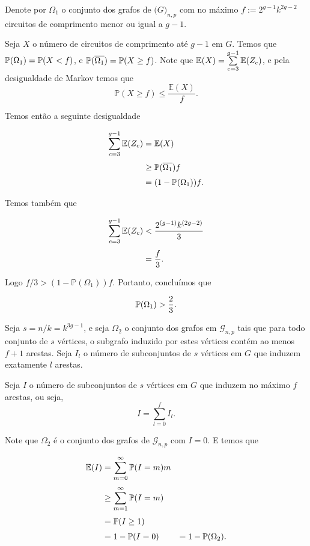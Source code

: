 Denote por $\Omega_1$ o conjunto dos grafos de $\mathbb(G)_{n,p}$ com no máximo $f := 2^{g-1}k^{2g-2}$ circuitos de comprimento menor ou igual a $g-1$.

Seja $X$ o número de circuitos de comprimento até $g-1$ em $G$. Temos que $\mathbb{P}(\Omega_1) = \mathbb{P}(X < f)$, e $\mathbb{P}(\overline{\Omega_1}) = \mathbb{P}(X\geq f)$. Note que $\mathbb{E}(X) = \sum\limits_{c=3}^{g-1}\mathbb{E}(Z_c)$, e pela desigualdade de Markov temos que \[\mathbb{P}(X \geq f) \leq \frac{\mathbb{E}(X)}{f}.\]

Temos então a seguinte desigualdade

\begin{equation*}
\setlength{\jot}{6pt}
\begin{aligned}
\sum\limits_{c=3}^{g-1}\bbe(Z_c) &= \bbe(X) \\ 
&\geq \bbp(\overline{\Omega_1})f \\
&= (1 - \bbp(\Omega_1))f.
\end{aligned}
\end{equation*}

Temos também que

\begin{equation*}
\setlength{\jot}{6pt}
\begin{aligned}
\sum\limits_{c=3}^{g-1}\bbe(Z_c) &< \frac{2^{(g-1)}k^{(2g-2)}}{3} \\
&= \frac{f}{3}.
\end{aligned}
\end{equation*}

Logo $f/3 > (1-\mathbb{P}(\Omega_1))f$. Portanto, concluímos que

\begin{equation}\label{teoerdosomega1}
\mathbb{P}(\Omega_1) > \frac{2}{3}.  
\end{equation}

Seja $s = n/k = k^{3g-1}$, e seja $\Omega_2$ o conjunto dos grafos em $\mathcal{G}_{n,p}$ tais que para todo conjunto de $s$ vértices, o subgrafo induzido por estes vértices contém ao menos $f+1$ arestas. Seja $I_l$ o número de subconjuntos de $s$ vértices em $G$ que induzem exatamente $l$ arestas.

Seja $I$ o número de subconjuntos de $s$ vértices em $G$ que induzem no máximo $f$ arestas, ou seja, \[I = \sum\limits_{l=0}^{f}I_l.\]

Note que $\Omega_2$ é o conjunto dos grafos de $\mathcal{G}_{n,p}$ com $I = 0$. E temos que

\begin{equation*}
\setlength{\jot}{6pt}
\begin{aligned}
\bbe(I) &= \sum\limits_{m=0}^{\infty}\bbp(I = m)m \\
&\geq \sum\limits_{m=1}^{\infty}\bbp(I = m) \\
&= \bbp(I \geq 1) \\
&= 1 - \bbp(I = 0) &= 1 - \bbp(\Omega_2).
\end{aligned}
\end{equation*}

